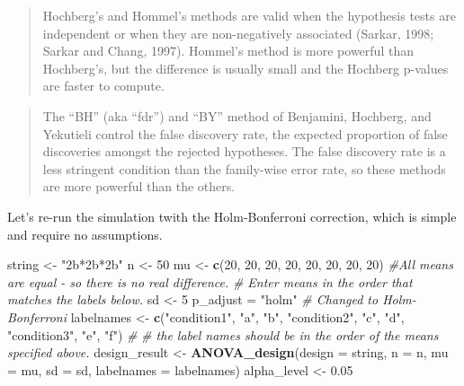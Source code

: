 \documentclass[]{book}
\newenvironment{Shaded}{\begin{snugshade}}{\end{snugshade}}
\newcommand{\CommentTok}[1]{\textcolor[rgb]{0.56,0.35,0.01}{\textit{#1}}}
\newcommand{\DataTypeTok}[1]{\textcolor[rgb]{0.13,0.29,0.53}{#1}}
\newcommand{\DecValTok}[1]{\textcolor[rgb]{0.00,0.00,0.81}{#1}}
\newcommand{\FloatTok}[1]{\textcolor[rgb]{0.00,0.00,0.81}{#1}}
\newcommand{\KeywordTok}[1]{\textcolor[rgb]{0.13,0.29,0.53}{\textbf{#1}}}
\newcommand{\NormalTok}[1]{#1}
\newcommand{\StringTok}[1]{\textcolor[rgb]{0.31,0.60,0.02}{#1}}
\begin{document}
\begin{quote}
Hochberg's and Hommel's methods are valid when the hypothesis tests are independent or when they are non-negatively associated (Sarkar, 1998; Sarkar and Chang, 1997). Hommel's method is more powerful than Hochberg's, but the difference is usually small and the Hochberg p-values are faster to compute.
\end{quote}

\begin{quote}
The ``BH'' (aka ``fdr'') and ``BY'' method of Benjamini, Hochberg, and Yekutieli control the false discovery rate, the expected proportion of false discoveries amongst the rejected hypotheses. The false discovery rate is a less stringent condition than the family-wise error rate, so these methods are more powerful than the others.
\end{quote}

Let's re-run the simulation twith the Holm-Bonferroni correction, which is simple and require no assumptions.

\begin{Shaded}
\begin{Highlighting}[]
\NormalTok{string <-}\StringTok{ "2b*2b*2b"}
\NormalTok{n <-}\StringTok{ }\DecValTok{50}
\NormalTok{mu <-}\StringTok{ }\KeywordTok{c}\NormalTok{(}\DecValTok{20}\NormalTok{, }\DecValTok{20}\NormalTok{, }\DecValTok{20}\NormalTok{, }\DecValTok{20}\NormalTok{, }\DecValTok{20}\NormalTok{, }\DecValTok{20}\NormalTok{, }\DecValTok{20}\NormalTok{, }\DecValTok{20}\NormalTok{) }
\CommentTok{#All means are equal - so there is no real difference.}
\CommentTok{# Enter means in the order that matches the labels below.}
\NormalTok{sd <-}\StringTok{ }\DecValTok{5}
\NormalTok{p_adjust =}\StringTok{ "holm"}
\CommentTok{# Changed to Holm-Bonferroni}
\NormalTok{labelnames <-}\StringTok{ }\KeywordTok{c}\NormalTok{(}\StringTok{"condition1"}\NormalTok{, }\StringTok{"a"}\NormalTok{, }\StringTok{"b"}\NormalTok{, }
                \StringTok{"condition2"}\NormalTok{, }\StringTok{"c"}\NormalTok{, }\StringTok{"d"}\NormalTok{, }
                \StringTok{"condition3"}\NormalTok{, }\StringTok{"e"}\NormalTok{, }\StringTok{"f"}\NormalTok{) }\CommentTok{#}
\CommentTok{# the label names should be in the order of the means specified above.}
\NormalTok{design_result <-}\StringTok{ }\KeywordTok{ANOVA_design}\NormalTok{(}\DataTypeTok{design =}\NormalTok{ string,}
                   \DataTypeTok{n =}\NormalTok{ n, }
                   \DataTypeTok{mu =}\NormalTok{ mu, }
                   \DataTypeTok{sd =}\NormalTok{ sd, }
                   \DataTypeTok{labelnames =}\NormalTok{ labelnames)}
\NormalTok{alpha_level <-}\StringTok{ }\FloatTok{0.05}
\end{Highlighting}
\end{Shaded}
\end{document}
